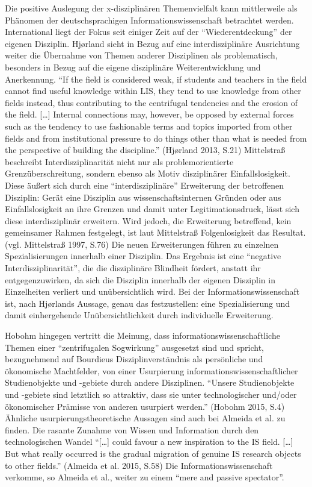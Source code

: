 \documentclass[a4paper,
fontsize=11pt,
oneside,
numbers=noperiodatend,
parskip=half-,
bibliography=totoc,
final
]{scrartcl}
\begin{document}
Die positive Auslegung der x-disziplinären Themenvielfalt kann
mittlerweile als Phänomen der deutschsprachigen Informationswissenschaft
betrachtet werden. International liegt der Fokus seit einiger Zeit auf
der \enquote{Wiederentdeckung} der eigenen Disziplin. Hjørland sieht in
Bezug auf eine interdisziplinäre Ausrichtung weiter die Übernahme von
Themen anderer Disziplinen als problematisch, besonders in Bezug auf die
eigene disziplinäre Weiterentwicklung und Anerkennung. \enquote{If the
field is considered weak, if students and teachers in the field cannot
find useful knowledge within LIS, they tend to use knowledge from other
fields instead, thus contributing to the centrifugal tendencies and the
erosion of the field. {[}\ldots{}{]} Internal connections may, however,
be opposed by external forces such as the tendency to use fashionable
terms and topics imported from other fields and from institutional
pressure to do things other than what is needed from the perspective of
building the discipline.} (Hjørland 2013, S.21) Mittelstraß beschreibt
Interdisziplinarität nicht nur als problemorientierte
Grenzüberschreitung, sondern ebenso als Motiv disziplinärer
Einfallslosigkeit. Diese äußert sich durch eine
\enquote{interdisziplinäre} Erweiterung der betroffenen Disziplin: Gerät
eine Disziplin aus wissenschaftsinternen Gründen oder aus
Einfallslosigkeit an ihre Grenzen und damit unter Legitimationsdruck,
lässt sich diese interdisziplinär erweitern. Wird jedoch, die
Erweiterung betreffend, kein gemeinsamer Rahmen festgelegt, ist laut
Mittelstraß Folgenlosigkeit das Resultat. (vgl. Mittelstraß 1997, S.76)
Die neuen Erweiterungen führen zu einzelnen Spezialisierungen innerhalb
einer Disziplin. Das Ergebnis ist eine \enquote{negative
Interdisziplinarität}, die die disziplinäre Blindheit fördert, anstatt
ihr entgegenzuwirken, da sich die Disziplin innerhalb der eigenen
Disziplin in Einzelheiten verliert und unübersichtlich wird. Bei der
Informationswissenschaft ist, nach Hjørlands Aussage, genau das
festzustellen: eine Spezialisierung und damit einhergehende
Unübersichtlichkeit durch individuelle Erweiterung.

Hobohm hingegen vertritt die Meinung, dass informationswissenschaftliche
Themen einer \enquote{zentrifugalen Sogwirkung} ausgesetzt sind und
spricht, bezugnehmend auf Bourdieus Disziplinverständnis als persönliche
und ökonomische Machtfelder, von einer Usurpierung
informationswissenschaftlicher Studienobjekte und -gebiete durch andere
Disziplinen. \enquote{Unsere Studienobjekte und -gebiete sind letztlich
so attraktiv, dass sie unter technologischer und/oder ökonomischer
Prämisse von anderen usurpiert werden.} (Hobohm 2015, S.4) Ähnliche
usurpierungstheoretische Aussagen sind auch bei Almeida et al. zu
finden. Die rasante Zunahme von Wissen und Information durch den
technologischen Wandel \enquote{{[}\ldots{}{]} could favour a new
inspiration to the IS field. {[}\ldots{}{]} But what really occurred is
the gradual migration of genuine IS research objects to other fields.}
(Almeida et al. 2015, S.58) Die Informationswissenschaft verkomme, so
Almeida et al., weiter zu einem \enquote{mere and passive spectator}.
\end{document}

